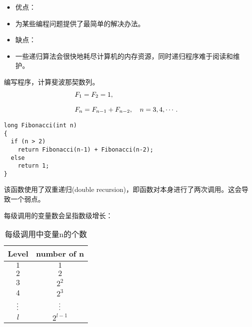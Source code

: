 \begin{frame}[fragile]
 

\begin{itemize}
\item 优点：
\item[] 
为某些编程问题提供了最简单的解决办法。\\[0.1in]
\item 缺点：
\item[]
一些递归算法会很快地耗尽计算机的内存资源，同时递归程序难于阅读和维护。
\end{itemize}

\end{frame}


\begin{frame}[fragile]

  \begin{free}[例]{}
    编写程序，计算斐波那契数列。
    $$
    \begin{aligned}
      &F_1=F_2=1,\\[0.1in]
      &F_n=F_{n-1}+F_{n-2}, \quad n=3,4,\cdots.
    \end{aligned}
    $$    
  \end{free}
\end{frame}


\begin{frame}[fragile]
\begin{lstlisting}
long Fibonacci(int n)
{
  if (n > 2)
    return Fibonacci(n-1) + Fibonacci(n-2);
  else
    return 1;
}
\end{lstlisting}

该函数使用了双重递归(double recursion)，即函数对本身进行了两次调用。这会导致一个弱点。
\end{frame}


\begin{frame}[fragile]
每级调用的变量数会呈指数级增长：
\begin{table}
\centering
\caption{每级调用中变量n的个数}
\begin{tabular}{cc}\hline
Level & number of n\\\hline
$1$ & $1$\\
$2$ & $2$\\
$3$ & $2^2$\\
$4$ & $2^3$\\
$\vdots$ & $\vdots$ \\
$l$ & $2^{l-1}$\\\hline
\end{tabular}
\end{table}
\end{frame}
